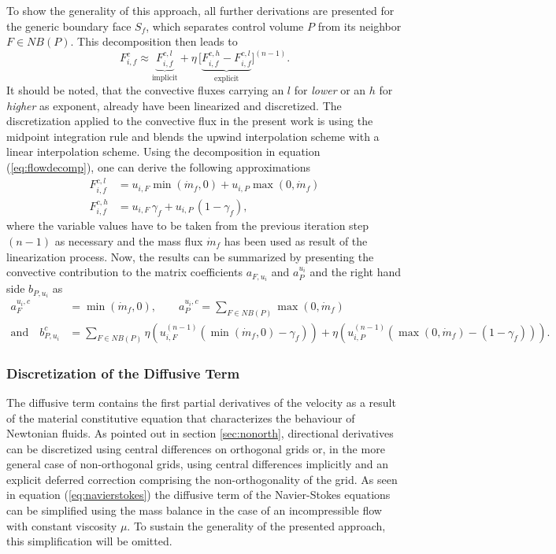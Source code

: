To show the generality of this approach, all further derivations are presented for the generic boundary face \(S_f\), which separates control volume \(P\) from its neighbor \(F \in NB(P)\). This decomposition then leads to
\begin{equation}
  \label{eq:flowdecomp}
  F_{i,f}^c \approx  \underbrace{F_{i,f}^{c,l}}_{\text{implicit}} + \eta \, \bigl[\underbrace{ F_{i,f}^{c,h} - F_{i,f}^{c,l} }_{\text{explicit}}\bigr]^{(n-1)}.
\end{equation}
It should be noted, that the convective fluxes carrying an \(l\) for \emph{lower} or an \(h\) for \emph{higher} as exponent, already have been linearized and discretized. The discretization applied to the convective flux in the present work is using the midpoint integration rule and blends the upwind interpolation scheme with a linear interpolation scheme. Using the decomposition in equation (\ref{eq:flowdecomp}), one can derive the following approximations
\begin{align*}
  F_{i,f}^{c,l} &= u_{i,F} \min(\dot{m}_f ,0) + u_{i,P} \max(0,\dot{m}_f) \\
  F_{i,f}^{c,h} &= u_{i,F} \, \gamma_f + u_{i,P} \, (1 - \gamma_f),
\end{align*}
where the variable values have to be taken from the previous iteration step \((n-1)\) as necessary and the mass flux \(\dot{m}_f\) has been used as result of the linearization process. Now, the results can be summarized by presenting the convective contribution to the matrix coefficients \(a_{F,u_i}\) and \(a_P^{u_i}\) and the right hand side \(b_{P,u_i}\) as
\begin{align*}
  a_F^{u_i,c} &= \min(\dot{m}_f ,0), \quad \quad a_P^{u_i,c} = \sum_{F \in NB(P)} \max(0,\dot{m}_f) \\[1em]
  \text{and} \quad b_{P,u_i}^c &= \sum_{F \in NB(P)} \eta  \left(u_{i,F}^{(n-1)} \left( \min(\dot{m}_f,0) - \gamma_f \right)\right)
                   + \eta \left( u_{i,P}^{(n-1)} \left( \max(0,\dot{m}_f) - \left(1 - \gamma_f\right) \right)\right).
\end{align*}

\subsubsection{Discretization of the Diffusive Term}

The diffusive term contains the first partial derivatives of the velocity as a result of the material constitutive equation that characterizes the behaviour of Newtonian fluids. As pointed out in section \ref{sec:nonorth}, directional derivatives can be discretized using central differences on orthogonal grids or, in the more general case of non-orthogonal grids, using central differences implicitly and an explicit deferred correction comprising the non-orthogonality of the grid. As seen in equation (\ref{eq:navierstokes}) the diffusive term of the Navier-Stokes equations can be simplified using the mass balance in the case of an incompressible flow with constant viscosity \(\mu\). To sustain the generality of the presented approach, this simplification will be omitted.


